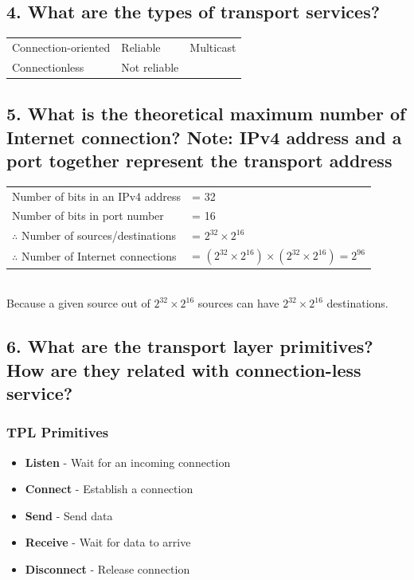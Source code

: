 \documentclass[a4paper,11pt]{article}
\begin{document}
\subsection*{4. What are the types of transport services?}
\begin{tabular}{l |l| l}
Connection-oriented &Reliable & Multicast\\
Connectionless	& Not reliable &
\end{tabular}


\subsection*{5. What is the theoretical maximum number of Internet connection?    Note: IPv4 address and a port together represent the transport address}

\begin{tabular}{l l}
	Number of bits in an IPv4 address &= 32\\
	Number of bits in port number &= 16\\
	$\therefore$ Number of sources/destinations & = $2^{32}\times2^{16}$\\
	$\therefore$ Number of Internet connections & = $(2^{32}\times2^{16}) \times (2^{32}\times2^{16}) = 2^{96}$
\end{tabular}\\[2mm]


Because a given source out of $2^{32}\times2^{16}$ sources can have $2^{32}\times2^{16}$ destinations.

\pagebreak
\subsection*{6. What are the transport layer primitives? How are they related with connection-less service?}
\subsubsection*{TPL Primitives}
\begin{itemize}
	\item \textbf{Listen} - Wait for an incoming connection
	\item \textbf{Connect} - Establish a connection
\item 	\textbf{Send} - Send data
\item 	\textbf{Receive} - Wait for data to arrive
\item	\textbf{Disconnect} - Release connection
	
\end{itemize}
\end{document}

